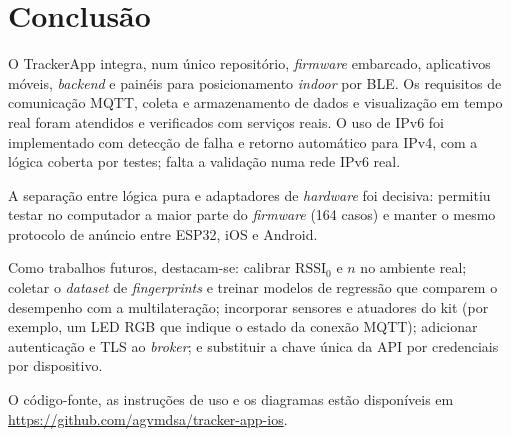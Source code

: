 \documentclass[12pt]{article}
\newcommand{\repo}{\url{https://github.com/agvmdsa/tracker-app-ios}}
\begin{document}
\section{Conclusão}
\label{sec:conclusao}

O TrackerApp integra, num único repositório, \textit{firmware} embarcado, aplicativos móveis,
\textit{backend} e painéis para posicionamento \textit{indoor} por BLE. Os requisitos de
comunicação MQTT, coleta e armazenamento de dados e visualização em tempo real foram atendidos e
verificados com serviços reais. O uso de IPv6 foi implementado com detecção de falha e retorno
automático para IPv4, com a lógica coberta por testes; falta a validação numa rede IPv6 real.

A separação entre lógica pura e adaptadores de \textit{hardware} foi decisiva: permitiu testar
no computador a maior parte do \textit{firmware} (164 casos) e manter o mesmo protocolo de anúncio
entre ESP32, iOS e Android.

Como trabalhos futuros, destacam-se: calibrar $\mathrm{RSSI}_0$ e $n$ no ambiente real; coletar o
\textit{dataset} de \textit{fingerprints} e treinar modelos de regressão que comparem o
desempenho com a multilateração; incorporar sensores e atuadores do kit (por exemplo, um LED RGB
que indique o estado da conexão MQTT); adicionar autenticação e TLS ao \textit{broker}; e
substituir a chave única da API por credenciais por dispositivo.

O código-fonte, as instruções de uso e os diagramas estão disponíveis em \repo.
\end{document}
